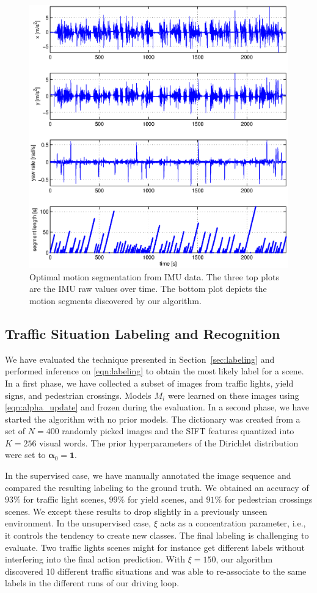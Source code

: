 \begin{figure}[t]
\centering
\includegraphics[width=0.8\columnwidth]{fig/cpResult.eps}
\caption{Optimal motion segmentation from IMU data. The three top plots are the
IMU raw values over time. The bottom plot depicts the motion segments
discovered by our algorithm.}
\label{fig:motion_segments}
\end{figure}

\subsection{Traffic Situation Labeling and Recognition}
We have evaluated the technique presented in Section~\ref{sec:labeling} and
performed inference on \eqref{eqn:labeling} to obtain the most likely label for
a scene. In a first phase, we have collected a subset of images from traffic
lights, yield signs, and pedestrian crossings. Models $M_i$ were learned on
these images using \eqref{eqn:alpha_update} and frozen during the evaluation. In
a second phase, we have started the algorithm with no prior models. The
dictionary was created from a set of $N=400$ randomly picked images and the SIFT
features quantized into $K=256$ visual words. The prior hyperparameters of the
Dirichlet distribution were set to $\boldsymbol{\alpha}_0=\mathbf{1}$.

In the supervised case, we have manually annotated the image sequence and
compared the resulting labeling to the ground truth. We obtained an
accuracy of $93\%$ for traffic light scenes, $99\%$ for yield scenes, and
$91\%$ for pedestrian crossings scenes. We except these results to drop slightly
in a previously unseen environment. In the unsupervised case, $\xi$ acts as a
concentration parameter, i.e., it controls the tendency to create new classes.
The final labeling is challenging to evaluate. Two traffic lights
scenes might for instance get different labels without interfering into the
final action prediction. With $\xi=150$, our algorithm discovered $10$ different
traffic situations and was able to re-associate to the same labels in the
different runs of our driving loop.

